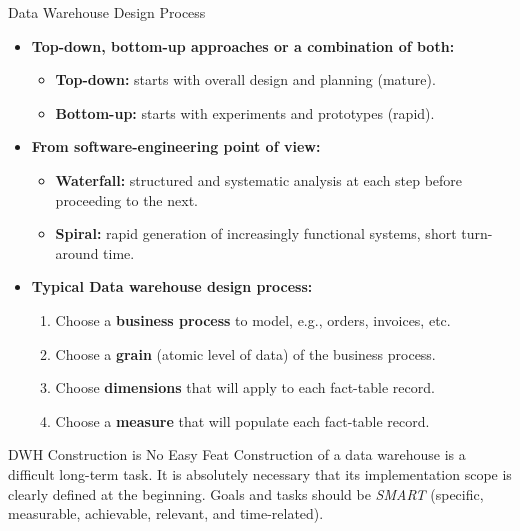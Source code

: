 \begin{frame}{Data Warehouse Design Process}
	\vspace{-0.5em}
	\begin{itemize}
		\item \textbf{Top-down, bottom-up approaches or a combination of both:}
		      \begin{itemize}
			      \item \textbf{\color{airforceblue}Top-down:} starts with overall design and planning (mature).
			      \item \textbf{\color{airforceblue}Bottom-up:} starts with experiments and prototypes (rapid).
		      \end{itemize}
		\item \textbf{From software-engineering point of view:}
		      \begin{itemize}
			      \item \textbf{\color{airforceblue}Waterfall:} structured and systematic analysis at each step before proceeding to the next.
			      \item \textbf{\color{airforceblue}Spiral:} rapid generation of increasingly functional systems, short turn-around time.
		      \end{itemize}
		\item \textbf{Typical Data warehouse design process:}
		      \begin{enumerate}
			      \item Choose a \textbf{\color{airforceblue}business process} to model, e.g., orders, invoices, etc.
			      \item Choose a \textbf{\color{airforceblue}grain} (atomic level of data) of the business process.
			      \item Choose \textbf{\color{airforceblue}dimensions} that will apply to each fact-table record.
			      \item Choose a \textbf{\color{airforceblue}measure} that will populate each fact-table record.
		      \end{enumerate}
	\end{itemize}

	\begin{alertblock}{DWH Construction is No Easy Feat}
		Construction of a data warehouse is a difficult long-term task. It is absolutely necessary that its implementation scope is clearly defined at the beginning. Goals and tasks should be \textit{SMART} (specific, measurable, achievable, relevant, and time-related).
	\end{alertblock}
\end{frame}

